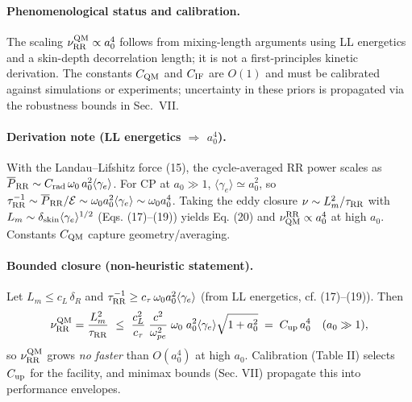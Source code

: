 \documentclass[aps,pre,twocolumn,showpacs,superscriptaddress]{revtex4-2}
\theoremstyle{definition}
\begin{document}
\paragraph*{Phenomenological status and calibration.}
The scaling $\nu_{\rm RR}^{\rm QM} \propto a_0^4$ follows from mixing-length arguments using LL energetics and a skin-depth decorrelation length; it is not a first-principles kinetic derivation. The constants $C_{\rm QM}$ and $C_{\rm IF}$ are $O(1)$ and must be calibrated against simulations or experiments; uncertainty in these priors is propagated via the robustness bounds in Sec.~VII.

\paragraph*{Derivation note (LL energetics $\Rightarrow$ $a_0^4$).}
With the Landau–Lifshitz force (15), the cycle-averaged RR power scales as $\overline{P}_{\rm RR}\sim C_{\rm rad}\,\omega_0\,a_0^2\langle \gamma_e\rangle$.
For CP at $a_0\gg1$, $\langle\gamma_e\rangle\simeq a_0^2$, so $\tau_{\rm RR}^{-1}\sim \overline{P}_{\rm RR}/\mathcal{E}\sim \omega_0 a_0^2\langle\gamma_e\rangle \sim \omega_0 a_0^4$.
Taking the eddy closure $\nu\sim L_m^2/\tau_{\rm RR}$ with $L_m\sim\delta_{\rm skin}\langle\gamma_e\rangle^{1/2}$ (Eqs. (17)–(19)) yields Eq. (20) and $\nu^{\rm RR}_{\rm QM}\propto a_0^4$ at high $a_0$.
Constants $C_{\rm QM}$ capture geometry/averaging.

\paragraph*{Bounded closure (non-heuristic statement).}
Let $L_m\le c_L\,\delta_R$ and $\tau_{\rm RR}^{-1}\ge c_\tau\,\omega_0 a_0^2\langle\gamma_e\rangle$ (from LL energetics, cf. (17)–(19)). Then 
\[
\nu_{\rm RR}^{\rm QM}=\frac{L_m^2}{\tau_{\rm RR}}\ \le\ \frac{c_L^2}{c_\tau}\;\frac{c^2}{\omega_{pe}^2}\;\omega_0\;a_0^2\langle\gamma_e\rangle\sqrt{1+a_0^2}\;=\;C_{\rm up}\,a_0^4 \quad (a_0\gg1),
\]
so $\nu_{\rm RR}^{\rm QM}$ grows \emph{no faster} than $O(a_0^4)$ at high $a_0$. Calibration (Table II) selects $C_{\rm up}$ for the facility, and minimax bounds (Sec. VII) propagate this into performance envelopes.
\end{document}
